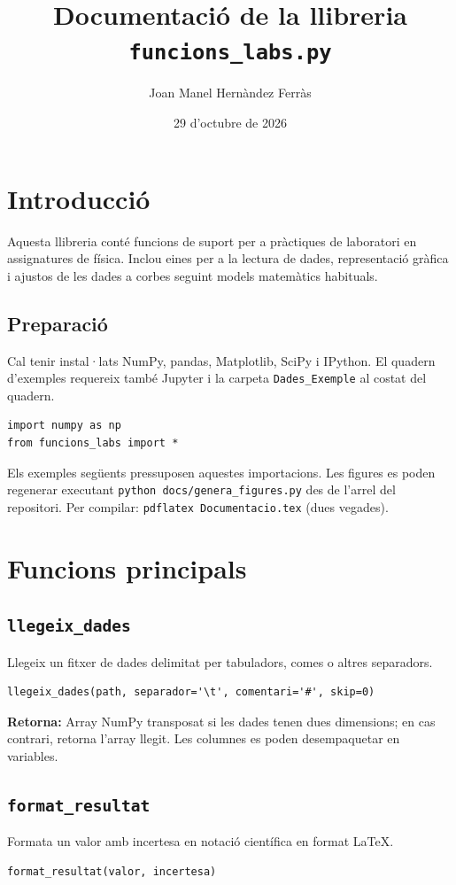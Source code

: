 \documentclass[11pt,a4paper]{article}
\title{Documentació de la llibreria \texttt{funcions\_labs.py}}
\author{Joan Manel Hernàndez Ferràs}
\date{29 d’octubre de 2026}
\begin{document}
\maketitle

\section{Introducció}
Aquesta llibreria conté funcions de suport per a pràctiques de laboratori en assignatures de física. Inclou eines per a la lectura de dades, representació gràfica i ajustos de les dades a corbes seguint models matemàtics habituals.

\subsection*{Preparació}
Cal tenir instal·lats NumPy, pandas, Matplotlib, SciPy i IPython.
El quadern d'exemples requereix també Jupyter i la carpeta
\texttt{Dades\_Exemple} al costat del quadern.
\begin{lstlisting}
import numpy as np
from funcions_labs import *
\end{lstlisting}
Els exemples següents pressuposen aquestes importacions. Les figures es poden
regenerar executant \texttt{python docs/genera\_figures.py} des de l'arrel
del repositori. Per compilar: \texttt{pdflatex Documentacio.tex} (dues vegades).

\section{Funcions principals}

\subsection{\texttt{llegeix\_dades}}
Llegeix un fitxer de dades delimitat per tabuladors, comes o altres separadors.
\begin{lstlisting}
llegeix_dades(path, separador='\t', comentari='#', skip=0)
\end{lstlisting}
\textbf{Retorna:} Array NumPy transposat si les dades tenen dues dimensions; en cas contrari, retorna l'array llegit. Les columnes es poden desempaquetar en variables.





\subsection{\texttt{format\_resultat}}
Formata un valor amb incertesa en notació científica en format \LaTeX.
\begin{lstlisting}
format_resultat(valor, incertesa)
\end{lstlisting}
\end{document}
